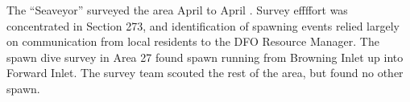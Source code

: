The ``Seaveyor'' surveyed the area April  to April .
Survey effﬀort was concentrated in Section 273, and identiﬁcation of spawning events relied largely on communication from local residents to the DFO Resource Manager.
The spawn dive survey in Area 27 found spawn running from Browning Inlet up into Forward Inlet.
The survey team scouted the rest of the area, but found no other spawn.  